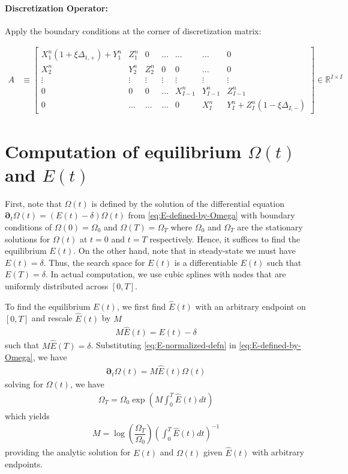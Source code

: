 \documentclass[11pt]{article}
\newcommand{\D}[1][]{\ensuremath{\boldsymbol{\partial}_{#1}}}
\newcommand{\R}{\ensuremath{\mathbb{R}}}
\begin{document}
\paragraph{Discretization Operator:} Apply the boundary conditions at the corner of discretization matrix:

\begin{align}
		A &\equiv \begin{bmatrix}
	X_1^n(1+\xi\Delta_{1,+})+Y_1^n & Z_1^n & 0 & \ldots & \ldots & \ldots & 0\\
	X^n_2 & Y^n_2 & Z^n_2 & 0 & 0 & \ldots & 0\\
	\vdots & \vdots & \vdots & \vdots & \vdots & \vdots & \vdots\\		
	0 & 0 & 0 & \ldots & X^n_{I-1} & Y^n_{I-1} & Z^n_{I-1}\\
	0 & \ldots & \ldots & \ldots & 0 & X_I^n & Y_I^n+Z_I^n(1-\xi\Delta_{I,-})
\end{bmatrix}\in\R^{I\times I}\label{eq:A-n}
\end{align}


\section{Computation of equilibrium $\Omega(t)$ and $E(t)$}
First, note that $\Omega(t)$ is defined by the solution of the differential equation $	\D[t] \Omega(t) = \left(E(t) - \delta \right)\Omega(t)$ from \cref{eq:E-defined-by-Omega} with boundary conditions of $\Omega(0) = \Omega_0$ and $\Omega(T) = \Omega_T$ where $\Omega_0$ and $\Omega_T$ are the stationary solutions for $\Omega(t)$ at $t = 0$ and $t = T$ respectively. Hence, it suffices to find the equilibrium $E(t)$. On the other hand, note that in steady-state we must have $E(t) = \delta$. Thus, the search space for $E(t)$ is a differentiable $E(t)$ such that $E(T) = \delta$. In actual computation, we use cubic splines with nodes that are uniformly distributed across $[0,T]$.

To find the equilibrium $E(t)$, we first find $\widehat E(t)$ with an arbitrary endpoint on $[0,T]$ and rescale $\widehat E(t)$ by $M$ 
\begin{align}\label{eq:E-normalized-defn}
	M \widehat E(t) = E(t) - \delta
\end{align}
such that $M \widehat E(T) = \delta$. Substituting \cref{eq:E-normalized-defn} in \cref{eq:E-defined-by-Omega}, we have 
\begin{align}
\D[t] \Omega(t) = M \widehat{E}(t) \Omega(t)
\end{align}
solving for $\Omega(t)$, we have
\begin{align}
\Omega_T = \Omega_0 \exp \left(M \int_0^T \widehat{E}(t) dt\right)
\end{align}
which yields
\begin{align}
M = \log \left(\dfrac{\Omega_T}{\Omega_0}\right)\left(\int_0^T \widehat E(t) dt \right)^{-1}
\end{align}
providing the analytic solution for $E(t)$ and $\Omega(t)$ given $\widehat{E} (t)$ with arbitrary endpoints.
\end{document}
